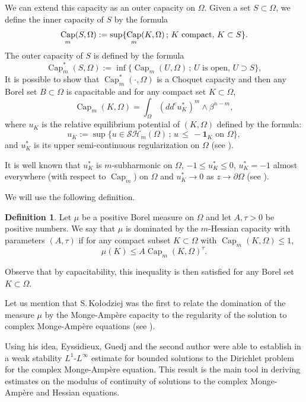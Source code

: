 \documentclass[JEP,XML,SOM,Unicode]{cedram}
\newcommand{\sep}{\,;\,}
\theoremstyle{definition}
\newtheorem{definition}[theorem]{Definition}
\DeclareMathOperator{\Capa}{Cap}
\begin{document}
We can extend this capacity as an outer capacity on $\Omega$. Given a set $S \subset \Omega$, we define the inner capacity of $S$ by the formula
\[
\Capa_m(S,\Omega):= \sup \{\Capa_m(K,\Omega) \sep K \, \, \hbox{compact}, \, K \subset S\}.
\]
The outer capacity of $S$ is defined by the formula
\[
\Capa^*_m(S,\Omega):= \inf \{\Capa_m(U,\Omega) \sep U\text{ is open}, \,U \supset S\},
\]
It is possible to show that $\Capa^*_m(\cdot,\Omega)$ is a Choquet capacity and then any Borel set $ B \subset \Omega$ is capacitable and
for any compact set $K \subset \Omega$,
\begin{equation} \label{eq:cap}
\Capa_m(K,\Omega)=\int_{\Omega}(dd^c u_K^*)^m\wedge\beta^{n-m},
\end{equation}
where $u_K$ is the relative equilibrium potential of $(K,\Omega)$ defined by the formula:
\[
u_K:=\sup\{u\in \mathcal{SH}_m(\Omega) \sep u \, \leq \, -\mathbf{1}_K \text{ on }\Omega\},
\]
and $u_K^*$ is its upper semi-continuous regularization on $\Omega$ (see \cite{Lu12}).

It is well known that $u_K^*$ is $m$-subharmonic on $\Omega$, $- 1 \leq u_K^* \leq 0$, $u_K^*= - 1$ almost everywhere (with respect to $\Capa_m$) on $\Omega$ and $u_K^* \to 0$ as $z \to \partial \Omega$ (see \cite{Lu12}).

We will use the following definition.
\begin{definition} \label{def:cap-domination} Let $\mu$ be a positive Borel measure on $\Omega$ and let $A,\tau > 0$ be positive numbers. We say that $\mu$ is dominated by the $m$-Hessian capacity with parameters $(A,\tau)$ if for any compact subset $K \subset \Omega$ with $\Capa_m (K,\Omega) \leq 1$,
\begin{equation} \label{eq:capdomination}
\mu (K) \leq A \Capa_m (K,\Omega)^{\tau}.
\end{equation}
\end{definition}
Observe that by capacitability, this inequality is then satisfied for any Borel set $K \subset \Omega$.

Let us mention that S.\,Ko\l odziej was the first to relate the domination of the measure $\mu$ by the Monge-Ampère capacity to the regularity of the solution to complex Monge-Ampère equations (see \cite{Kol96}).

Using his idea, Eyssidieux, Guedj and the second author were able to establish in \cite{EGZ09} a weak stability $L^1$-$L^{\infty}$ estimate for bounded solutions to the Dirichlet problem for the complex Monge-Ampère equation. This result is the main tool in deriving estimates on the modulus of continuity of solutions to the complex Monge-Ampère and Hessian equations.
\end{document}

